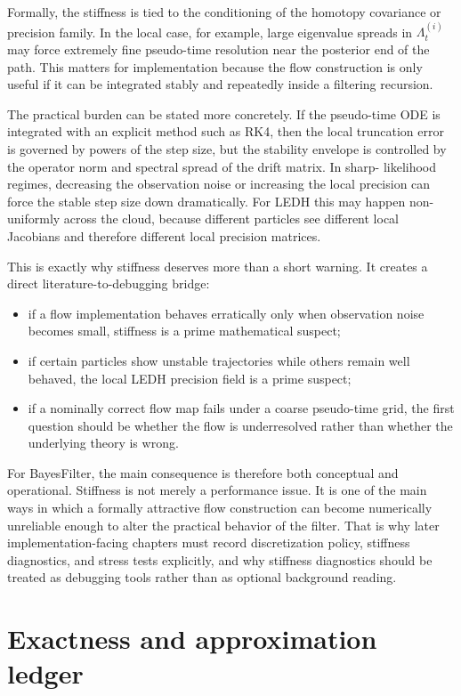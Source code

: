 Formally, the stiffness is tied to the conditioning of the homotopy covariance
or precision family.  In the local case, for example, large eigenvalue spreads
in $\Lambda_t^{(i)}$ may force extremely fine pseudo-time resolution near the
posterior end of the path.  This matters for implementation because the flow
construction is only useful if it can be integrated stably and repeatedly inside
a filtering recursion.

The practical burden can be stated more concretely.  If the pseudo-time ODE is
integrated with an explicit method such as RK4, then the local truncation error
is governed by powers of the step size, but the stability envelope is controlled
by the operator norm and spectral spread of the drift matrix.  In sharp-
likelihood regimes, decreasing the observation noise or increasing the local
precision can force the stable step size down dramatically.  For LEDH this may
happen non-uniformly across the cloud, because different particles see different
local Jacobians and therefore different local precision matrices.

This is exactly why stiffness deserves more than a short warning.  It creates a direct literature-to-debugging bridge:
\begin{itemize}
  \item if a flow implementation behaves erratically only when observation noise
    becomes small, stiffness is a prime mathematical suspect;
  \item if certain particles show unstable trajectories while others remain well
    behaved, the local LEDH precision field is a prime suspect;
  \item if a nominally correct flow map fails under a coarse pseudo-time grid,
    the first question should be whether the flow is underresolved rather than
    whether the underlying theory is wrong.
\end{itemize}

For BayesFilter, the main consequence is therefore both conceptual and
operational.  Stiffness is not merely a performance issue.  It is one of the
main ways in which a formally attractive flow construction can become
numerically unreliable enough to alter the practical behavior of the filter.
That is why later implementation-facing chapters must record discretization
policy, stiffness diagnostics, and stress tests explicitly, and why stiffness diagnostics should be treated as debugging tools rather
than as optional background reading.

\section{Exactness and approximation ledger}
\label{sec:bf-pff-claim-ledger}

